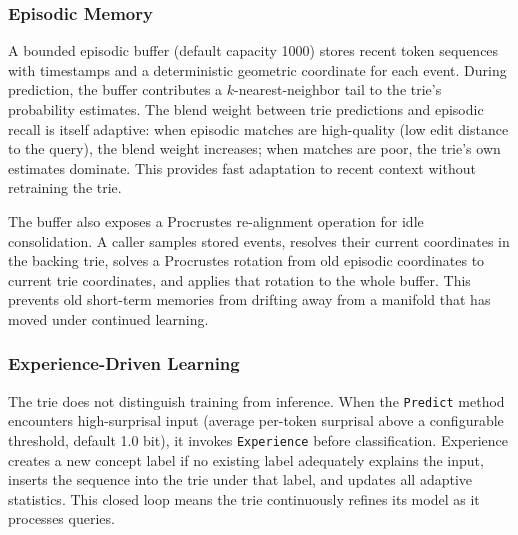 \subsubsection{Episodic Memory}

A bounded episodic buffer (default capacity 1000) stores recent
token sequences with timestamps and a deterministic geometric coordinate
for each event.  During prediction, the buffer
contributes a $k$-nearest-neighbor tail to the trie's probability
estimates.  The blend weight between trie predictions and episodic
recall is itself adaptive: when episodic matches are high-quality
(low edit distance to the query), the blend weight increases; when
matches are poor, the trie's own estimates dominate.  This provides
fast adaptation to recent context without retraining the trie.

The buffer also exposes a Procrustes re-alignment operation for idle
consolidation.  A caller samples stored events, resolves their current
coordinates in the backing trie, solves a Procrustes rotation from old
episodic coordinates to current trie coordinates, and applies that
rotation to the whole buffer.  This prevents old short-term memories from
drifting away from a manifold that has moved under continued learning.

\subsubsection{Experience-Driven Learning}

The trie does not distinguish training from inference.  When the
\texttt{Predict} method encounters high-surprisal input (average
per-token surprisal above a configurable threshold, default 1.0 bit),
it invokes \texttt{Experience} before classification.  Experience
creates a new concept label if no existing label adequately explains
the input, inserts the sequence into the trie under that label, and
updates all adaptive statistics.  This closed loop means the trie
continuously refines its model as it processes queries.
